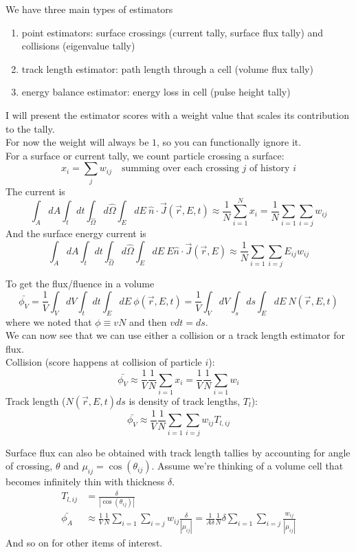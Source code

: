 \documentclass[12pt]{article}
\newcommand{\rvec}{\ensuremath{\vec{r}}}
\newcommand{\vOmega}{\ensuremath{\hat{\Omega}}}
\begin{document}

We have three main types of estimators
\begin{enumerate}
\item point estimators: surface crossings (current tally, surface flux tally) and collisions (eigenvalue tally)
\item track length estimator: path length through a cell (volume flux tally)
\item energy balance estimator: energy loss in cell (pulse height tally)
\end{enumerate}
%
I will present the estimator scores with a weight value that scales its contribution to the tally.\\
For now the weight will always be $1$, so you can functionally ignore it. \\

For a surface or current tally, we count particle crossing a surface:
\[
x_i = \sum_j w_{ij} \quad \text{summing over each crossing }j\text{ of history }i
\]
The current is
\[
\int_A dA \int_t dt \int_{\vOmega} d\vOmega \int_E dE\: \hat{n} \cdot \vec{J}(\rvec, E, t) \approx \frac{1}{N} \sum_{i=1}^N x_i = \frac{1}{N} \sum_{i=1}\sum_{i=j} w_{ij}
\]
And the surface energy current is
\[
\int_A dA \int_t dt  \int_{\vOmega} d\vOmega \int_E dE\: E\hat{n} \cdot \vec{J}(\rvec, E) \approx \frac{1}{N} \sum_{i=1}\sum_{i=j} E_{ij}w_{ij}
\]

To get the flux/fluence in a volume
\[
\bar{\phi_V} = \frac{1}{V}\int_V dV \int_t dt \int_E dE\: \phi(\rvec, E,t) =  \frac{1}{V}\int_V dV \int_s ds \int_E dE\: N(\rvec, E,t)
\]
where we noted that $\phi \equiv vN$ and then $vdt = ds$.\\
We can now see that we can use either a collision or a track length estimator for flux.\\
Collision (score happens at collision of particle $i$):
\[
\bar{\phi_V} \approx \frac{1}{V}\frac{1}{N} \sum_{i=1} x_i = \frac{1}{V}\frac{1}{N} \sum_{i=1} w_i
\]
Track length ($N(\rvec, E,t)ds$ is density of track lengths, $T_l$):
\[
\bar{\phi_V} \approx \frac{1}{V}\frac{1}{N} \sum_{i=1}\sum_{i=j} w_{ij}T_{l,ij}
\]

Surface flux can also be obtained with track length tallies by accounting for angle of crossing, $\theta$ and $\mu_{ij} = \cos(\theta_{ij})$. Assume we're thinking of a volume cell that becomes infinitely thin with thickness $\delta$. 
\begin{align*}
T_{l,ij} &= \frac{\delta}{|\cos(\theta_{ij})|}\\
\bar{\phi_A} &\approx \frac{1}{V}\frac{1}{N} \sum_{i=1}\sum_{i=j} w_{ij}\frac{\delta}{|\mu_{ij}|} = \frac{1}{A \delta}\frac{1}{N} \delta \sum_{i=1}\sum_{i=j} \frac{w_{ij}}{|\mu_{ij}|}
\end{align*}
%
And so on for other items of interest.
\end{document}
